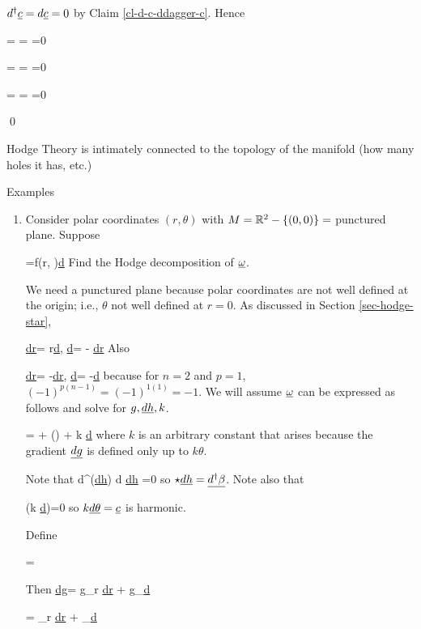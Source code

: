 $d^\dagger \rvc=d\rvc=0$ by Claim \ref{cl-d-c-ddagger-c}.
Hence

\beq
\av{\rva, \rvb}=
=
=0
\eeq

\beq
\av{\rva, \rvc}=
=
=0
\eeq

\beq
\av{\rvb, \rvc}=
=
=0
\eeq



\qed

Hodge Theory is intimately
connected to the topology of the manifold (how many holes it has, etc.)

Examples
\begin{enumerate}
\item 
Consider polar coordinates $(r, \theta)$ with $M={ \mathbb{R}}^2-\{(0,0)\}=$ punctured plane.
Suppose 

\beq
\pform{\omega}{}=f(r, \theta)\ul{d\theta}
\eeq
Find the Hodge decomposition of
$\ul{\omega}$.

We need a punctured plane because 
polar coordinates are
not well defined at the origin; i.e.,  $\theta$ not well defined at $r=0$.
As discussed in 
Section \ref{sec-hodge-star},


\beq
\star \ul{dr}=
r\ul{d\theta},
\quad
\star \ul{d\theta}=
-\;
\ul{dr}
\eeq
Also

\beq
\star \star \ul{dr}=
-\ul{dr},
\quad 
\star \star \ul{d\theta}=
-\ul{d\theta}
\eeq
because for $n=2$  and $p=1$, $(-1)^{p(n-1)}=
(-1)^{1(1)}=-1$.
We will assume $\ul{\omega}$
can be expressed as follows
and solve for $g, \ul{dh}, k$.


\beq
\pform{\omega}{}
=
+ 
\star()
+ k \ul{d\chi}{}
\eeq
where $k$ is an arbitrary constant
that arises because the gradient 
$\ul{dg}$ is defined only up to $k \theta$.

Note that
\beq
d^\dag (\star \ul{dh})\propto \;
\star d \star\star \ul{dh}
=0
\eeq
so $\star \ul{dh} = \ul{d^\dagger \beta}$.
Note also that

\beq
\Delta (k \ul{d\theta})=0
\eeq
so $k \ul{d\theta}=\ul{c}$ is harmonic.

Define

\beq
\pform{\chi}{}= 
\eeq

Then
\beq
\ul{dg}=
g_r \ul{dr} 
+
g_\theta \ul{d\theta}
\eeq

\beq
\ul{\chi}=
\chi_r \ul{dr} 
+
\chi_\theta \ul{d\theta}
\eeq


\end{enumerate}

